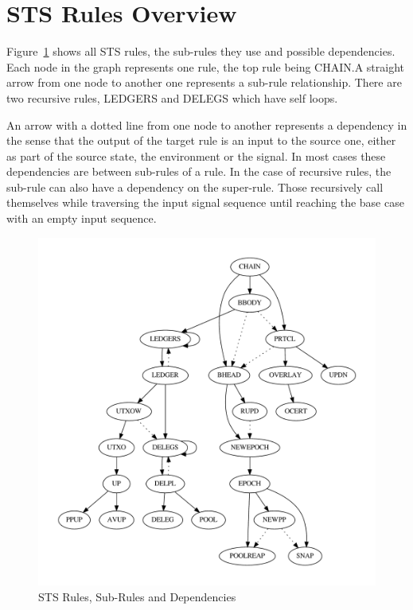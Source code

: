 \section{STS Rules Overview}
\label{sec:sts-rules-overview}

Figure~\ref{fig:sts-rules-dependencies} shows all STS rules, the sub-rules they
use and possible dependencies. Each node in the graph represents one rule, the
top rule being CHAIN.\@ A straight arrow from one node to another one represents
a sub-rule relationship. There are two recursive rules, LEDGERS and DELEGS which
have self loops.

An arrow with a dotted line from one node to another represents a dependency in
the sense that the output of the target rule is an input to the source one,
either as part of the source state, the environment or the signal. In most cases
these dependencies are between sub-rules of a rule. In the case of recursive
rules, the sub-rule can also have a dependency on the super-rule. Those
recursively call themselves while traversing the input signal sequence until
reaching the base case with an empty input sequence.

\begin{figure}[htp]
  \centering
  \includegraphics[width=\textwidth]{rules}
  \caption{STS Rules, Sub-Rules and Dependencies}
  \label{fig:sts-rules-dependencies}
\end{figure}

